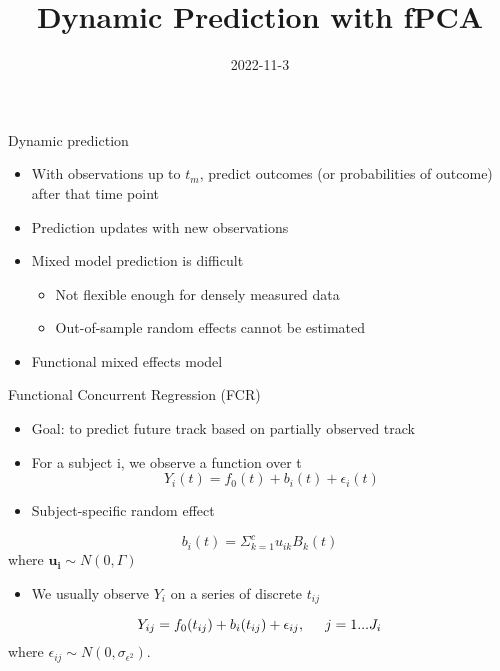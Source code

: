 \documentclass[
  ignorenonframetext,
]{beamer}
\title{Dynamic Prediction with fPCA}
\author{}
\date{\vspace{-2.5em}2022-11-3}
\providecommand{\tightlist}{%
  \setlength{\itemsep}{0pt}\setlength{\parskip}{0pt}}
\begin{document}
\frame{\titlepage}

\begin{frame}{Dynamic prediction}
\protect\hypertarget{dynamic-prediction}{}
\begin{itemize}
\tightlist
\item
  With observations up to \(t_m\), predict outcomes (or probabilities of
  outcome) after that time point
\item
  Prediction updates with new observations
\item
  Mixed model prediction is difficult

  \begin{itemize}
  \tightlist
  \item
    Not flexible enough for densely measured data
  \item
    Out-of-sample random effects cannot be estimated
  \end{itemize}
\item
  Functional mixed effects model
\end{itemize}
\end{frame}

\begin{frame}{Functional Concurrent Regression (FCR)}
\protect\hypertarget{functional-concurrent-regression-fcr}{}
\begin{itemize}
\item
  Goal: to predict future track based on partially observed track
\item
  For a subject i, we observe a function over t
  \[Y_i(t)=f_0(t)+b_i(t)+\epsilon_i(t)\]
\item
  Subject-specific random effect
\end{itemize}

\[b_i(t) = \Sigma_{k=1}^c u_{ik}B_k(t)\] where
\(\boldsymbol{u_i}\sim N(0, \Gamma)\)

\begin{itemize}
\tightlist
\item
  We usually observe \(Y_i\) on a series of discrete \(t_{ij}\)
\end{itemize}

\[Y_{ij} = f_0(t_{ij})+b_i(t_{ij})+\epsilon_{ij}, \hspace{0.5cm} j = 1...J_i\]
where \(\epsilon_{ij} \sim N(0, \sigma_{\epsilon^2})\).
\end{frame}
\end{document}
